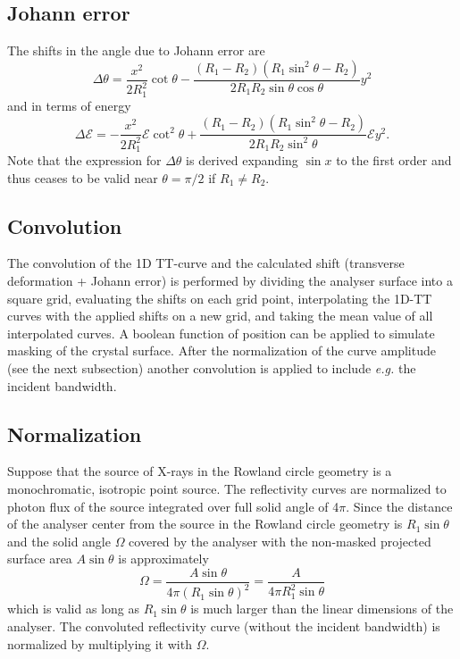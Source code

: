 \documentclass[11pt,a4paper]{article}
\begin{document}
\subsection{Johann error}
The shifts in the angle due to Johann error are
\begin{equation}
\Delta \theta = \frac{x^2}{2 R_1^2} \cot \theta 
- \frac{(R_1 -R_2)(R_1 \sin^2 \theta - R_2)}{2 R_1 R_2 \sin \theta \cos \theta}y^2
\end{equation} 
and in terms of energy
\begin{equation}
\Delta \mathcal{E} = -\frac{x^2}{2 R_1^2} \mathcal{E} \cot^2 \theta
+ \frac{(R_1 -R_2)(R_1 \sin^2 \theta - R_2)}{2 R_1 R_2 \sin^2 \theta} \mathcal{E}  y^2.
\end{equation}
Note that the expression for $\Delta \theta$ is derived expanding $\sin x$ to the first order and thus ceases to be valid near $\theta = \pi/2$ if $R_1 \neq R_2$.

\subsection{Convolution}
The convolution of the 1D TT-curve and the calculated shift (transverse deformation + Johann error) is performed by dividing the analyser surface into a square grid, evaluating the shifts on each grid point, interpolating the 1D-TT curves with the applied shifts on a new grid, and taking the mean value of all interpolated curves. A boolean function of position can be applied to simulate masking of the crystal surface. After the normalization of the curve amplitude (see the next subsection) another convolution is applied to include \emph{e.g.} the incident bandwidth.

\subsection{Normalization}
Suppose that the source of X-rays in the Rowland circle geometry is a monochromatic, isotropic point source. The reflectivity curves are normalized to photon flux of the source integrated over full solid angle of 4$\pi$. Since the distance of the analyser center from the source in the Rowland circle geometry is $R_1 \sin \theta$ and the solid angle $\Omega$ covered by the analyser with the non-masked projected surface area $A \sin \theta$ is approximately
\begin{equation}
\Omega = \frac{A \sin \theta}{4 \pi (R_1 \sin \theta )^2} 
= \frac{A }{4 \pi  R_1^2 \sin \theta}
\end{equation}
which is valid as long as $R_1 \sin \theta$ is much larger than the linear dimensions of the analyser. The convoluted reflectivity curve (without the incident bandwidth) is normalized by multiplying it with $\Omega$.




\end{document}
